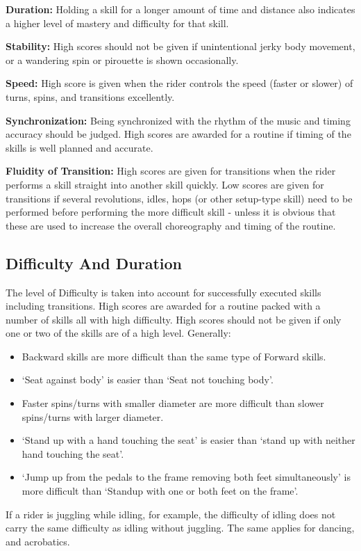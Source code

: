 \textbf{Duration:} Holding a skill for a longer amount of time and distance also indicates a higher level of mastery and difficulty for that skill.

\textbf{Stability:} High scores should not be given if unintentional jerky body movement, or a wandering spin or pirouette is shown occasionally.

\textbf{Speed:} High score is given when the rider controls the speed (faster or slower) of turns, spins, and transitions excellently.

\textbf{Synchronization:} Being synchronized with the rhythm of the music and timing accuracy should be judged.
High scores are awarded for a routine if timing of the skills is well planned and accurate.

\textbf{Fluidity of Transition:} High scores are given for transitions when the rider performs a skill straight into another skill quickly.
Low scores are given for transitions if several revolutions, idles, hops (or other setup-type skill) need to be performed before performing the more difficult skill - unless it is obvious that these are used to increase the overall choreography and timing of the routine.

\subsection{Difficulty And Duration}
The level of Difficulty is taken into account for successfully executed skills including transitions.
High scores are awarded for a routine packed with a number of skills all with high difficulty.
High scores should not be given if only one or two of the skills are of a high level.
Generally:
\begin{itemize}
\item Backward skills are more difficult than the same type of Forward skills.
\item `Seat against body' is easier than `Seat not touching body'.
\item Faster spins/turns with smaller diameter are more difficult than slower spins/turns with larger diameter.
\item `Stand up with a hand touching the seat' is easier than `stand up with neither hand touching the seat'.
\item `Jump up from the pedals to the frame removing both feet simultaneously' is more difficult than `Standup with one or both feet on the frame'.
\end{itemize}
If a rider is juggling while idling, for example, the difficulty of idling does not carry the same difficulty as idling without juggling.
The same applies for dancing, and acrobatics.

